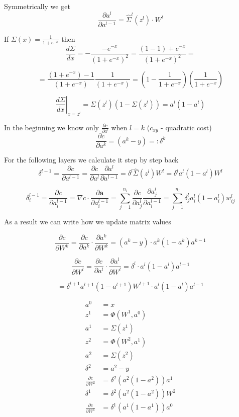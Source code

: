 \documentclass{article}
\begin{document}
Symmetrically we get
\[
\frac{\partial a^l}{\partial a^{l-1}} = \hat\Sigma^l(z^l) \cdot W^l
\]

If $\Sigma(x)=\frac{1}{1+e^{-x}}$ then
\[
\frac{d\Sigma}{dx} = - \frac{-e^{-x}}{(1+e^{-x})^2} = \frac{(1 - 1) + e^{-x}}{(1+e^{-x})^2} = 
\]

\[
= \frac{(1+e^{-x}) - 1}{(1+e^{-x})} \frac{1}{(1+e^{-x})} = \left(1 - \frac{1}{1+e^{-x}}\right) \left(\frac{1}{1+e^{-x}}\right)
\]

\[
\left. \frac{d\Sigma}{dx}\right|_{x=z^l} = \Sigma(z^l)(1 - \Sigma(z^l)) = a^l(1 - a^l)
\]

In the beginning we know only $\frac{\partial c}{\partial a^l}$ when $l=k$ ($c_{xy}$ - quadratic cost)
\[
\frac{\partial c}{\partial a^k} = (a^k - y) =: \delta^k
\]

For the following layers we calculate it step by step back
\[
\delta^{l-1} = \frac{\partial c}{\partial a^{l-1}} = \frac{\partial c}{\partial a^l} \frac{\partial a^l}{\partial a^{l-1}} = \delta^l \hat\Sigma(z^l)W^l = \delta^l a^l(1-a^l)W^l
\]

\[
\delta_i^{l-1} = \frac{\partial c}{\partial a_i^{l-1}} = \nabla c \cdot \frac{\partial \mathbf{a}}{\partial a_i^{l-1}} = \sum_{j=1}^{n_l} \frac{\partial c}{\partial a_j^l} \frac{\partial a_j^l}{\partial a_i^{l-1}} = \sum_{j=1}^{n_l} \delta_j^l a_i^l(1-a_i^l)w_{ij}^l
\]

As a result we can write how we update matrix values

\[
\frac{\partial c}{\partial W^k} = \frac{\partial c}{\partial a^k} \cdot \frac{\partial a^k}{\partial W^k} = (a^k - y) \cdot a^k(1 - a^k) a^{k-1}
\]

\[
\frac{\partial c}{\partial W^{l}} = \frac{\partial c}{\partial a^{l}} \cdot \frac{\partial a^{l}}{\partial W^{l}} = \delta^{l} \cdot a^l(1 - a^l) a^{l-1}
\]

\[
 = \delta^{l+1} a^{l+1}(1-a^{l+1})W^{l+1} \cdot a^l(1 - a^l) a^{l-1}
\]

\begin{align}
a^0 &= x \\
z^1 &= \Phi(W^1, a^0) \\
a^1 &= \Sigma(z^1) \\
z^2 &= \Phi(W^2, a^1) \\
a^2 &= \Sigma(z^2) \\
\delta^2 &= a^2 - y \\
\frac{\partial c}{\partial W^2} &= \delta^2 (a^2 (1-a^2) ) a^1 \\
\delta^1 &= \delta^2 (a^2 (1-a^2 )) W^2 \\
\frac{\partial c}{\partial W^1} &= \delta^1 (a^1 (1-a^1) ) a^0
\end{align}
\end{document}
